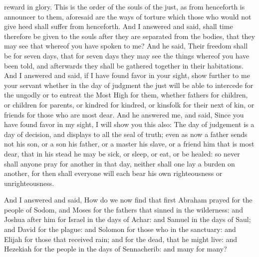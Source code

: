 {{} reward in glory.
This is the order of the souls of the just, as from henceforth
 is announcer to them,
{} aforesaid are the ways of torture which those who would not give heed shall suffer from henceforth.
And I answered and said, shall time therefore be given to the souls after they are separated from the bodies, that they may see that whereof you have spoken to me?
And he said, Their freedom shall be for seven days, that for seven days they may see the things whereof you have been told, and afterwards they shall be gathered together in their habitations.
And I answered and said, if I have found favor in your sight, show further to me your servant whether in the day of judgment the just will be able to intercede for the ungodly or to entreat the Most High for them,
whether fathers for children, or children for parents, or kindred for kindred, or kinsfolk for their next of kin, or
 friends for those who are most dear.
And he answered me, and said, Since you have found favor in my sight, I will show you this also: The day of judgement is
 a day of decision, and displays to all the seal of truth; even as now a father sends not his son, or a son his father, or a master his slave, or a
 friend him that is most dear, that in his stead he may
 be sick, or sleep, or eat, or be healed:
so never shall anyone pray for another
 in that day, neither shall one lay a burden on another, for then shall everyone will each bear his own righteousness or unrighteousness.
\par }{\PP {}And I answered and said, How do we now find that first Abraham prayed for the people of Sodom, and Moses for the fathers that sinned in the wilderness:
and Joshua after him for Israel in the days of
 Achar:
and Samuel
 in the days of Saul; and David for the plague: and Solomon for those who
{} in the sanctuary:
and Elijah for those that received rain; and for the dead, that he might live:
and Hezekiah for the people in the days of Sennacherib: and many for many?
}
